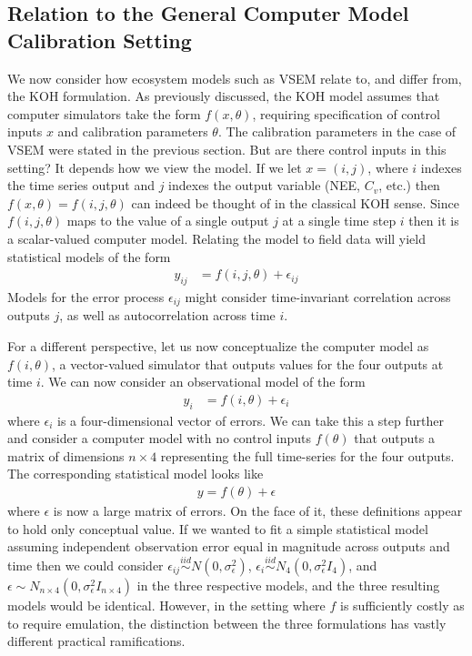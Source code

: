 \documentclass[12pt]{article}
\begin{document}
\subsection{Relation to the General Computer Model Calibration Setting}
We now consider how ecosystem models such as VSEM relate to, and differ from, the KOH formulation. As previously discussed, the KOH model assumes that
computer simulators take the form $f(x, \theta)$, requiring specification of control inputs $x$ and calibration parameters $\theta$. The calibration parameters 
in the case of VSEM were stated in the previous section. But are there control inputs in this setting? It depends how we view the model. If we let 
$x = (i, j)$, where $i$ indexes the time series output and $j$ indexes the output variable (NEE, $C_v$, etc.) then $f(x, \theta) = f(i, j, \theta)$ can indeed be thought of in the 
classical KOH sense. Since $f(i, j, \theta)$ maps to the value of a single output $j$ at a single time step $i$ then it is a scalar-valued computer model. Relating the 
model to field data will yield statistical models of the form 
\begin{align}
y_{ij} &= f(i, j, \theta) + \epsilon_{ij} \label{ij_model}
\end{align}
Models for the error process $\epsilon_{ij}$ might consider time-invariant correlation across outputs $j$, as well as autocorrelation across time $i$. 

For a different perspective, let us now conceptualize the computer model as $f(i, \theta)$, a vector-valued simulator that outputs values for the four outputs
at time $i$. We can now consider an observational model of the form 
\begin{align}
y_{i} &= f(i, \theta) + \epsilon_{i} \label{i_model}
\end{align}
where $\epsilon_{i}$ is a four-dimensional vector of errors. We can take this a step further and consider a computer model with no control inputs
$f(\theta)$ that outputs a matrix of dimensions $n \times 4$ representing the full time-series for the four outputs. The corresponding statistical model looks 
like
\begin{align}
y = f(\theta) + \epsilon \label{no_control_input_model}
\end{align}
where $\epsilon$ is now a large matrix of errors. On the face of it, these definitions appear to hold only conceptual value. If we wanted to fit a simple 
statistical model assuming independent observation error equal in magnitude across outputs and time then we could consider 
$\epsilon_{ij} \overset{iid}{\sim} N(0, \sigma_\epsilon^2)$, 
$\epsilon_i \overset{iid}{\sim} N_4(0, \sigma_\epsilon^2 I_4)$, and $\epsilon \sim N_{n \times 4}(0, \sigma_\epsilon^2 I_{n \times 4})$ 
in the three respective models, and the three resulting models would be identical. However, in the setting where $f$ is sufficiently costly 
as to require emulation, the distinction between the three formulations has vastly different practical ramifications. 
\end{document}
